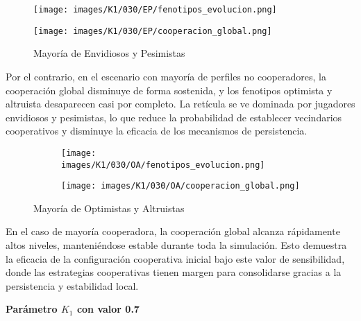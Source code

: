 \documentclass[a4paper,12pt]{report}
\begin{document}
\newpage

\begin{figure}[h]
    \centering
    \begin{minipage}{0.49\textwidth}
    \centering
    \texttt{[image: images/K1/030/EP/fenotipos\_evolucion.png]}
    \label{fig:enter-label}
    \end{minipage}
    \hfill
    \begin{minipage}{0.49\textwidth}
    \centering
    \texttt{[image: images/K1/030/EP/cooperacion\_global.png]}
    \label{fig:enter-label}
    \end{minipage}
    \caption{Mayoría de Envidiosos y Pesimistas}
\end{figure}

Por el contrario, en el escenario con mayoría de perfiles no cooperadores, la cooperación global disminuye de forma sostenida, y los fenotipos optimista y altruista desaparecen casi por completo. La retícula se ve dominada por jugadores envidiosos y pesimistas, lo que reduce la probabilidad de establecer vecindarios cooperativos y disminuye la eficacia de los mecanismos de persistencia.


\begin{figure}[h]
    \centering
    \begin{subfigure}[t]{0.49\textwidth}
        \centering
        \texttt{[image: images/K1/030/OA/fenotipos\_evolucion.png]}
        \label{fig:enter-label}
    \end{subfigure}
    \hfill
    \begin{subfigure}[t]{0.49\textwidth}
        \centering
        \texttt{[image: images/K1/030/OA/cooperacion\_global.png]}
        \label{fig:enter-label}
    \end{subfigure}
    \caption{Mayoría de Optimistas y Altruistas}
\end{figure}


En el caso de mayoría cooperadora, la cooperación global alcanza rápidamente altos niveles, manteniéndose estable durante toda la simulación. Esto demuestra la eficacia de la configuración cooperativa inicial bajo este valor de sensibilidad, donde las estrategias cooperativas tienen margen para consolidarse gracias a la persistencia y estabilidad local.


\newpage

\vspace{1.5em}
\noindent\textbf{Parámetro \( K_1 \) con valor 0.7}
\vspace{0.5em}
\end{document}
